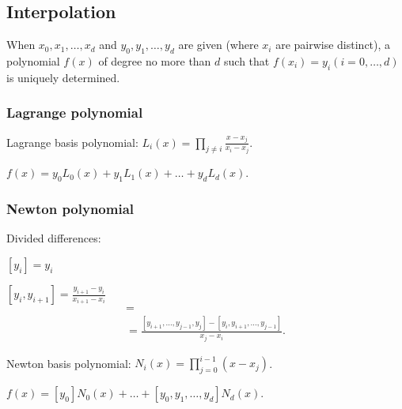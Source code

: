 \subsection{Interpolation}

When $x_0, x_1, \dots, x_d$ and $y_0, y_1, \dots, y_d$
are given (where $x_i$ are pairwise distinct), a polynomial
$f(x)$ of degree no more than $d$ such that $f(x_i) = y_i (i = 0, \dots, d)$
is uniquely determined.

\subsubsection{Lagrange polynomial}

Lagrange basis polynomial: $L_i(x) = \prod_{j \ne i} \frac{x - x_j}{x_i - x_j}$.
	
$f(x) = y_0 L_0(x) + y_1 L_1(x) + \dots + y_d L_d(x)$.

\subsubsection{Newton polynomial}

Divided differences:

$[y_i] = y_i$

$[y_i, y_{i + 1}] = \frac{y_{i + 1} - y_i}{x_{i + 1} - x_i}$
\begin{multline*}
[y_i, y_{i + 1}, \dots, y_{j - 1}, y_j] = \\
= \frac{[y_{i + 1}, \dots, y_{j - 1}, y_j] - [y_i, y_{i + 1}, \dots, y_{j - 1}]}{x_j - x_i}.
\end{multline*}

Newton basis polynomial: $N_i(x) = \prod_{j=0}^{i-1} (x - x_j)$.

$f(x) = [y_0] N_0(x) + \dots + [y_0, y_1, \dots, y_d] N_d(x)$.
